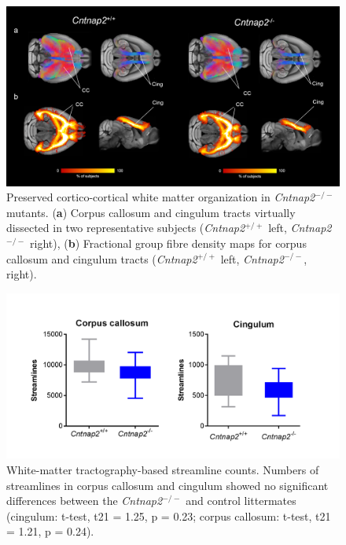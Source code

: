 \begin{figure}[th] 
    \centering
    \includegraphics[scale=0.45]{figures/cntnap2_figure_05.png}
    \decoRule
    \caption[Preserved cortico-cortical white matter organization
    in \textit{Cntnap2}$^{-/-}$ mutants.]{Preserved cortico-cortical white matter organization
    in \textit{Cntnap2}$^{-/-}$ mutants. (\textbf{a}) Corpus callosum and cingulum tracts virtually
    dissected in two representative subjects (\textit{Cntnap2}$^{+/+}$ left, \textit{Cntnap2}$^{-/-}$
    right), (\textbf{b}) Fractional group fibre density maps for corpus callosum and
    cingulum tracts (\textit{Cntnap2}$^{+/+}$ left, \textit{Cntnap2}$^{-/-}$, right).}
    \label{fig:cntnap2_fig05}
\end{figure}

\begin{figure}[th] 
    \centering
    \includegraphics[scale=0.4]{figures/cntnap2_figure_s7.png}
    \decoRule
    \caption[White-matter tractography-based streamline counts.]{White-matter
    tractography-based streamline counts.  Numbers of streamlines in corpus
    callosum and cingulum showed no significant differences between the
    \textit{Cntnap2}$^{-/-}$ and control littermates (cingulum: t-test, t21 = 1.25, p = 0.23;
    corpus callosum: t-test, t21 = 1.21, p = 0.24).}
    \label{fig:cntnap2_figs7}
\end{figure}

